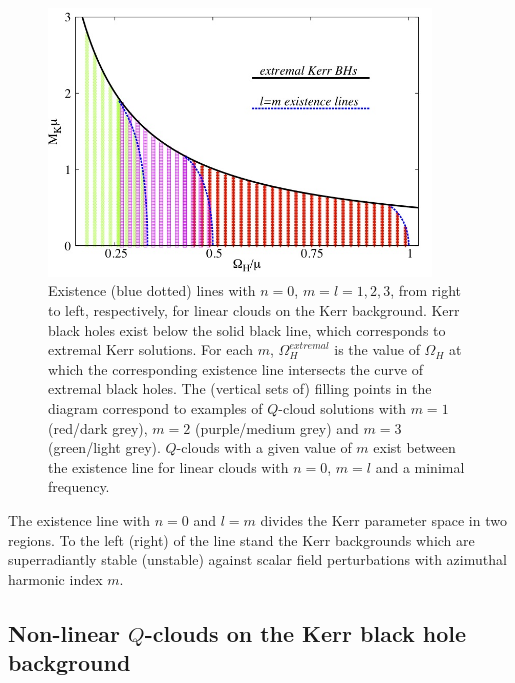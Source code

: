 \begin{figure}[h!]
\centering
\includegraphics[height=2.8in]{papers/QClouds/Mw.jpeg}
\caption{Existence (blue dotted) lines with $n=0$, $m=l=1,2,3$, from right to left, respectively, for linear clouds on the Kerr background.  Kerr black holes exist below the solid black line, which corresponds to extremal Kerr solutions. For each $m$, $\Omega_H^{extremal}$ is the value of $\Omega_H$ at which the corresponding existence line intersects the curve of extremal black holes. The (vertical sets of) filling points in the diagram correspond to examples of $Q$-cloud solutions with $m=1$ (red/dark grey), $m=2$ (purple/medium grey) and $m=3$ (green/light grey). $Q$-clouds with a given value of $m$ exist between the existence line for linear clouds with $n=0$, $m=l$ and a minimal frequency.} 
\label{existencelines}
\end{figure}

The existence line with $n=0$ and $l=m$ divides the Kerr parameter space in two regions. To the left (right) of the line stand the Kerr backgrounds which are superradiantly stable (unstable) against scalar field perturbations with azimuthal harmonic index $m$.


\subsection{Non-linear $Q$-clouds on the Kerr black hole background}

